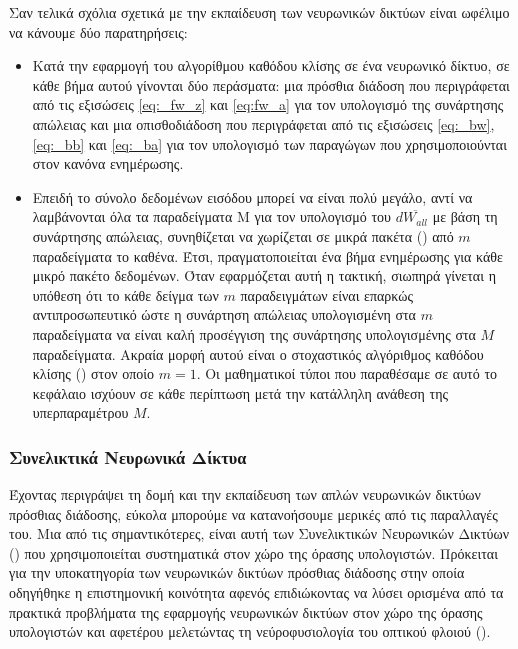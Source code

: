 Σαν τελικά σχόλια σχετικά με την εκπαίδευση των νευρωνικών δικτύων είναι ωφέλιμο να κάνουμε δύο παρατηρήσεις:
\begin{itemize}
  \item Κατά την εφαρμογή του αλγορίθμου καθόδου κλίσης σε ένα νευρωνικό δίκτυο, σε κάθε βήμα αυτού γίνονται δύο περάσματα: μια πρόσθια διάδοση που περιγράφεται από τις εξισώσεις \ref{eq:_fw_z} και \ref{eq:fw_a} για τον υπολογισμό της συνάρτησης απώλειας και μια οπισθοδιάδοση που περιγράφεται από τις εξισώσεις \ref{eq:_bw}, \ref{eq:_bb} και \ref{eq:_ba} για τον υπολογισμό των παραγώγων που χρησιμοποιούνται στον κανόνα ενημέρωσης.
  \item Επειδή το σύνολο δεδομένων εισόδου μπορεί να είναι πολύ μεγάλο, αντί να λαμβάνονται όλα τα παραδείγματα Μ για τον υπολογισμό του $d\overline{W_{all}}$ με βάση τη συνάρτησης απώλειας, συνηθίζεται να χωρίζεται σε μικρά πακέτα () από $m$ παραδείγματα το καθένα. Έτσι, πραγματοποιείται ένα βήμα ενημέρωσης για κάθε μικρό πακέτο δεδομένων. Όταν εφαρμόζεται αυτή η τακτική, σιωπηρά γίνεται η υπόθεση ότι το κάθε δείγμα των $m$ παραδειγμάτων είναι επαρκώς αντιπροσωπευτικό ώστε η συνάρτηση απώλειας υπολογισμένη στα $m$ παραδείγματα να είναι καλή προσέγγιση της συνάρτησης υπολογισμένης στα $M$ παραδείγματα. Ακραία μορφή αυτού είναι ο στοχαστικός αλγόριθμος καθόδου κλίσης () στον οποίο $m=1$. Οι μαθηματικοί τύποι που παραθέσαμε σε αυτό το κεφάλαιο ισχύουν σε κάθε περίπτωση μετά την κατάλληλη ανάθεση της υπερπαραμέτρου $M$.
\end{itemize}

\subsubsection{Συνελικτικά Νευρωνικά Δίκτυα}
\label{sec:_cnn}
Έχοντας περιγράψει τη δομή και την εκπαίδευση των απλών νευρωνικών δικτύων πρόσθιας διάδοσης, εύκολα μπορούμε να κατανοήσουμε μερικές από τις παραλλαγές του. Μια από τις σημαντικότερες, είναι αυτή των Συνελικτικών Νευρωνικών Δικτύων () που χρησιμοποιείται συστηματικά στον χώρο της όρασης υπολογιστών. Πρόκειται για την υποκατηγορία των νευρωνικών δικτύων πρόσθιας διάδοσης στην οποία οδηγήθηκε η επιστημονική κοινότητα αφενός επιδιώκοντας να λύσει ορισμένα από τα πρακτικά προβλήματα της εφαρμογής νευρωνικών δικτύων στον χώρο της όρασης υπολογιστών και αφετέρου μελετώντας τη νεύρο\textendash φυσιολογία του οπτικού φλοιού ().\par

